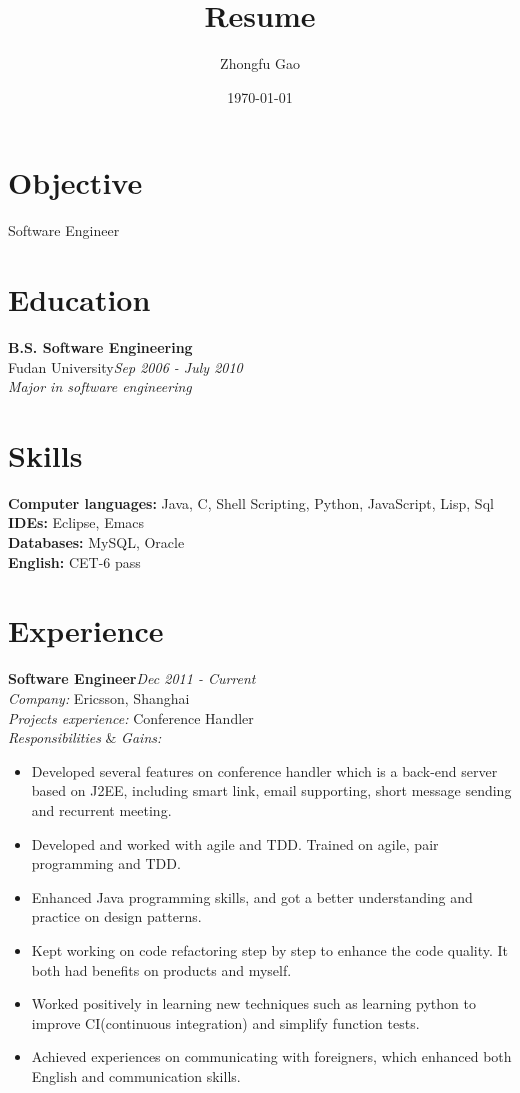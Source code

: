 \documentclass[line, margin, 11pt]{res}
\author{Zhongfu Gao}
\title{Resume}
\date{\today}
\begin{document}
\renewcommand{\namefont}{ \LARGE \bf } %
\address{{\bf Email: }joshuafufu@gmail.com}
\address{{\bf Mobile: }(+86)15921928229}

\begin{resume}

\section{Objective}
Software Engineer

\section{Education}
{\bf B.S. Software Engineering}\\
Fudan University\hfill {\it Sep 2006 - July 2010}\\
{\sl Major in software engineering}

\section{Skills}
{\bf Computer languages:} Java, C, Shell Scripting, Python, JavaScript, Lisp, Sql\\
{\bf IDEs:} Eclipse, Emacs\\
{\bf Databases:} MySQL, Oracle\\
{\bf English:} CET-6 pass


\section{Experience}

{\bf Software Engineer}\hfill {\it Dec 2011 - Current}\\
{\sl Company:} Ericsson, Shanghai\\
{\sl Projects experience:} Conference Handler\\
{\sl Responsibilities} \& {\sl Gains:}
\begin{itemize}
\item Developed several features on conference handler which is a back-end server based on J2EE, including smart link, email supporting, short message sending and recurrent meeting.
\item Developed and worked with agile and TDD. Trained on agile, pair programming and TDD.
\item Enhanced Java programming skills, and got a better understanding and practice on design patterns.
\item Kept working on code refactoring step by step to enhance the code quality. It both had benefits on products and myself.
\item Worked positively in learning new techniques such as learning python to improve CI(continuous integration) and simplify function tests.
\item Achieved experiences on communicating with foreigners, which enhanced both English and communication skills.
\end{itemize}


\end{resume}
\end{document}
